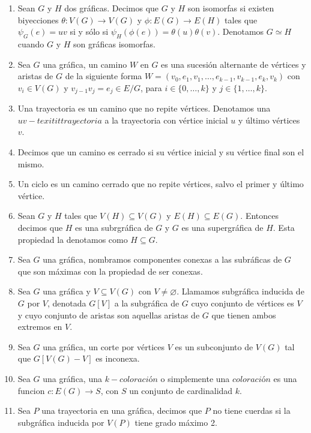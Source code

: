 \begin{definicion}
\begin{enumerate}
        \item Sean $G$ y $H$ dos gr\'aficas. Decimos que $G$ y $H$ son
         isomorfas si existen biyecciones $\theta: V(G) \rightarrow V(G)$ y
         $\phi: E(G) \rightarrow E(H)$ tales que $\psi_G(e)=uv$ si y s\'olo
         si $\psi_H(\phi(e))= \theta(u)\theta(v)$. Denotamos $G \simeq H$
         cuando $G$ y $H$ son gr\'aficas isomorfas.
        \item Sea $G$ una gr\'afica, un camino $W$ en $G$ es una sucesi\'on
        alternante de v\'ertices y aristas de $G$ de la siguiente forma
        $W=(v_0, e_1,v_1, \dots, e_{k-1},v_{k-1}, e_k,v_k)$ con $v_i \in
        V(G)$ y $v_{j-1}v_j = e_j \in E/G$, para $i \in \{0, \dots, k\}$ y
        $j \in \{ 1, \dots, k\}$.
        \item Una trayectoria es un camino que no repite v\'ertices.
        Denotamos una $uv-texitit{trayectoria}$ a la trayectoria con
        v\'ertice inicial $u$ y \'ultimo v\'ertices $v$.
        \item Decimos que un camino es cerrado si su v\'ertice inicial y su
        v\'ertice final son el mismo.
        \item Un ciclo es un camino cerrado que no repite v\'ertices, salvo
        el primer y \'ultimo v\'ertice.
        \item Sean $G$ y $H$ tales que $V(H) \subseteq V(G)$ y $E(H)
        \subseteq E(G)$. Entonces decimos que $H$ es una subrgr\'afica de
        $G$ y $G$ es una supergr\'afica de $H$. Esta propiedad la denotamos
        como $H \subseteq G$. 
        \item Sea $G$ una gr\'afica, nombramos componentes conexas a las
        subr\'aficas de $G$ que son m\'aximas con la propiedad de ser
        conexas.
        \item Sea $G$ una gr\'afica y $V \subseteq V(G)$ con $V \neq
        \varnothing$. Llamamos subgr\'afica inducida de $G$ por $V$,
        denotada $G[V]$ a la subgr\'afica de $G$ cuyo conjunto de v\'ertices
        es $V$ y cuyo conjunto de aristas son aquellas aristas de $G$ que
        tienen ambos extremos en $V$.
        \item Sea $G$ una gr\'afica, un corte por v\'ertices $V$ es un
        subconjunto de $V(G)$ tal que $G[V(G)-V]$ es inconexa.
        \item Sea $G$ una gr\'afica, una $k-\textit{coloraci\'on}$ o simplemente
        una $\textit{coloraci\'on}$ es una funcion $c: E(G)\rightarrow S$, con
        $S$ un conjunto de cardinalidad $k$.
        \item Sea $P$ una trayectoria en una gr\'afica, decimos que $P$ no
        tiene cuerdas si la subgr\'afica inducida por $V(P)$ tiene grado
        m\'aximo 2.
    \end{enumerate}

    
\end{definicion}

